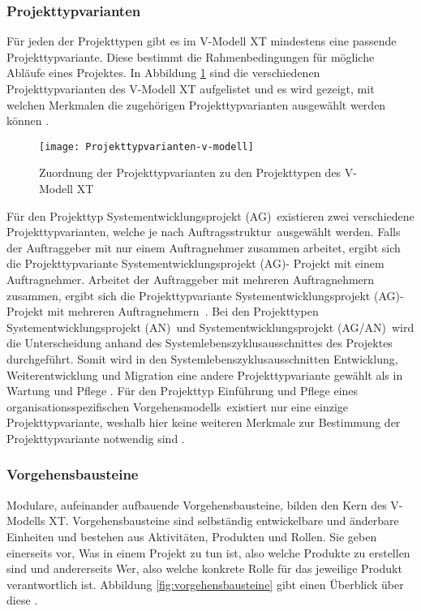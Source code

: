 \subsubsection{Projekttypvarianten}
Für jeden der Projekttypen gibt es im V-Modell XT mindestens eine passende Projekttypvariante. Diese bestimmt die Rahmenbedingungen für mögliche Abläufe eines Projektes. In Abbildung \ref{fig:Projekttypvarianten} sind die verschiedenen Projekttypvarianten des V-Modell XT aufgelistet und es wird gezeigt, mit welchen Merkmalen die zugehörigen Projekttypvarianten ausgewählt werden können \cite{2004vmodell}.   
\begin{figure}[htp]
\begin{center}
  \texttt{[image: Projekttypvarianten-v-modell]} %
  \caption{Zuordnung der Projekttypvarianten zu den Projekttypen des V-Modell XT \cite{2004vmodell}}
  \label{fig:Projekttypvarianten}
\end{center}
\end{figure}

Für den Projekttyp \grqq Systementwicklungsprojekt (AG)\grqq \ existieren zwei verschiedene Projekttypvarianten, welche je nach \grqq Auftragsstruktur\grqq \ ausgewählt werden. Falls der Auftraggeber mit nur einem Auftragnehmer zusammen arbeitet, ergibt sich die Projekttypvariante \grqq Systementwicklungsprojekt (AG)- Projekt mit einem Auftragnehmer\grqq. Arbeitet der Auftraggeber mit mehreren Auftragnehmern zusammen, ergibt sich die Projekttypvariante \grqq Systementwicklungsprojekt (AG)- Projekt mit mehreren Auftragnehmern\grqq \ \cite{2004vmodell}.\newline
Bei den Projekttypen \grqq Systementwicklungsprojekt (AN)\grqq \ und \grqq Systementwicklungsprojekt (AG/AN)\grqq \ wird die Unterscheidung anhand des Systemlebenszyklusausschnittes des Projektes durchgeführt. Somit wird in den Systemlebenszyklusausschnitten Entwicklung, Weiterentwicklung und Migration eine andere Projekttypvariante gewählt als in Wartung und Pflege \cite{2004vmodell}.\newline 
Für den Projekttyp \grqq Einführung und Pflege eines organisationsspezifischen Vorgehensmodells\grqq \ existiert nur eine einzige Projekttypvariante, weshalb hier keine weiteren Merkmale zur Bestimmung der Projekttypvariante notwendig sind \cite{2004vmodell}.\newline

  
 \subsubsection{Vorgehensbausteine}
Modulare, aufeinander aufbauende Vorgehensbausteine, bilden den Kern des V-Modells XT. Vorgehensbausteine sind selbständig entwickelbare und änderbare Einheiten und bestehen aus Aktivitäten, Produkten und Rollen. Sie geben einerseits vor, \grqq Was\grqq{}  in einem Projekt zu tun ist, also welche Produkte zu erstellen sind und andererseits \grqq Wer\grqq, also welche konkrete Rolle für das jeweilige Produkt verantwortlich ist. Abbildung \ref{fig:vorgehensbausteine} gibt einen Überblick über diese \cite{ruf2008, 2004vmodell}.\newline

